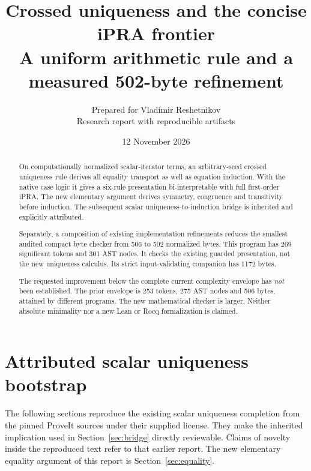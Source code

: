 \documentclass[11pt]{article}
\title{\textbf{Crossed uniqueness and the concise iPRA frontier}\\[5pt]
\large A uniform arithmetic rule and a measured 502-byte refinement}
\author{Prepared for Vladimir Reshetnikov\\
\small Research report with reproducible artifacts}
\date{12 November 2026}
\begin{document}
\maketitle
\begin{abstract}
On computationally normalized scalar-iterator terms, an arbitrary-seed
crossed uniqueness rule derives all equality transport as well as equation
induction. With the native case logic it gives a six-rule presentation
bi-interpretable with full first-order iPRA. The new elementary argument
derives symmetry, congruence and transitivity before induction. The
subsequent scalar uniqueness-to-induction bridge is inherited and
explicitly attributed.

Separately, a composition of existing implementation refinements reduces
the smallest audited compact byte checker from 506 to 502 normalized bytes.
This program has 269 significant tokens and 301 AST nodes. It checks the
existing guarded presentation, not the new uniqueness calculus. Its strict
input-validating companion has 1172 bytes.

The requested improvement below the complete current complexity envelope
has \emph{not} been established. The prior envelope is 253 tokens,
275 AST nodes and 506 bytes, attained by different programs. The new
mathematical checker is larger. Neither absolute minimality nor a new
Lean or Rocq formalization is claimed.
\end{abstract}
\tableofcontents
\newpage




\appendix
\clearpage
\section{Attributed scalar uniqueness bootstrap}\label{app:ur}
The following sections reproduce the existing scalar uniqueness completion
from the pinned ProveIt sources under their supplied license. They make
the inherited implication used in Section~\ref{sec:bridge} directly
reviewable. Claims of novelty inside the reproduced text refer to that
earlier report. The new elementary equality argument of this report is
Section~\ref{sec:equality}.
\makeatletter
{}
\makeatother

\clearpage

\end{document}
